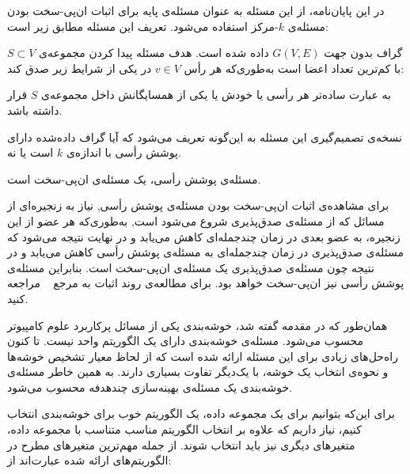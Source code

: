 در این پایان‌نامه، از این مسئله به عنوان مسئله‌ی پایه برای اثبات ان‌پی-سخت بودن مسئله‌ی $k$-مرکز استفاده می‌شود. تعریف این مسئله مطابق زیر است:


گراف بدون جهت $G(V, E)$ داده شده است. هدف مسئله پیدا کردن مجموعه‌ی $S \subset V$ با کم‌ترین تعداد اعضا است به‌طوری‌که هر رأس $v \in V$ در یکی از شرایط زیر صدق کند:





به عبارت ساده‌تر هر رأسی یا خودش یا یکی از همسایگانش داخل مجموعه‌ی $S$ قرار داشته باشد.

نسخه‌ی تصمیم‌گیری این مسئله به این‌گونه تعریف می‌شود که آیا گراف داده‌شده دارای پوشش رأسی با اندازه‌ی $k$ است یا نه.


مسئله‌ی پوشش رأسی، یک مسئله‌ی ان‌پی-سخت است.



برای مشاهده‌ی اثبات ان‌پی-سخت بودن مسئله‌ی پوشش رأسی, نیاز به زنجیره‌ای از مسائل که از مسئله‌ی صدق‌پذیری شروع می‌شود است, به‌طوری‌که هر عضو از این زنجیره، به عضو بعدی در زمان چندجمله‌ای کاهش می‌یابد و در نهایت نتیجه می‌شود که مسئله‌ی صدق‌پذیری در زمان چندجمله‌ای به مسئله‌ی پوشش رأسی کاهش می‌یابد و در نتیجه چون مسئله‌ی صدق‌پذیری یک مسئله‌ی ان‌پی-سخت است.
بنابراین مسئله‌ی پوشش رأسی نیز ان‌پی-سخت خواهد بود. برای مطالعه‌ی روند اثبات به مرجع ~ مراجعه کنید. 



همان‌طور که در مقدمه گفته شد، خوشه‌بندی یکی از مسائل پرکاربرد علوم کامپیوتر محسوب می‌شود.
مسئله‌ی خوشه‌بندی دارای یک الگوریتم واحد نیست.
تا کنون راه‌حل‌های زیادی برای این مسئله ارائه شده است که از لحاظ معیار تشخیص خوشه‌ها و نحوه‌ی انتخاب یک خوشه، با یک‌دیگر تفاوت بسیاری دارند.
به همین خاطر مسئله‌ی خوشه‌بندی یک مسئله‌ی بهینه‌سازی چندهدفه محسوب می‌شود.

برای این‌که بتوانیم برای یک مجموعه داده، یک الگوریتم خوب برای خوشه‌بندی انتخاب کنیم، نیاز داریم که علاوه بر انتخاب الگوریتم مناسب متناسب با مجموعه داده، متغیرهای دیگری نیز باید انتخاب شوند.
از جمله مهم‌ترین متغیرهای مطرح در الگوریتم‌های ارائه شده عبارت‌اند از:

